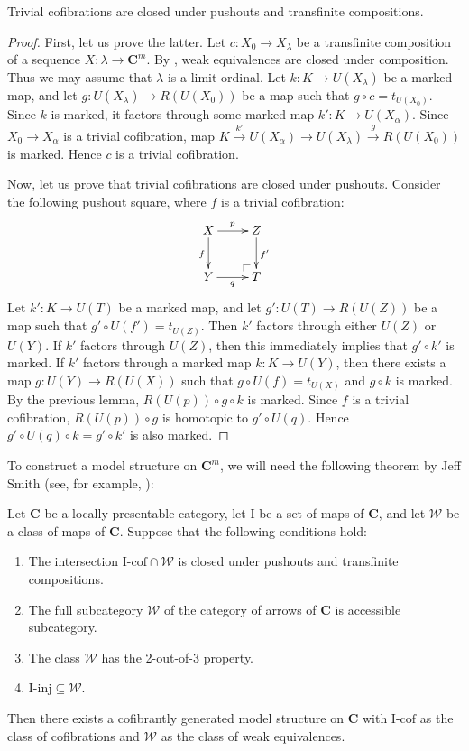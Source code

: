 \documentclass[reqno]{amsart}
\makeatletter
\theoremstyle{definition}
\theoremstyle{remark}
\newcommand{\cat}[1]{\mathbf{#1}}
\newcommand{\C}{\cat{C}}
\newcommand{\we}{\mathcal{W}}
\newcommand{\I}{\mathrm{I}}
\newcommand{\class}[2]{#1\text{-}\mathrm{#2}}
\newcommand{\Icof}[1][\I]{\class{#1}{cof}}
\newcommand{\Iinj}[1][\I]{\class{#1}{inj}}
\numberwithin{figure}{section}
\newcommand{\po}[1][dr]{\save*!/#1+1.2pc/#1:(1,-1)@^{|-}\restore}
\makeatother
\begin{document}
\begin{prop}
Trivial cofibrations are closed under pushouts and transfinite compositions.
\end{prop}
\begin{proof}
First, let us prove the latter.
Let $c : X_0 \to X_\lambda$ be a transfinite composition of a sequence $X : \lambda \to \C^m$.
By , weak equivalences are closed under composition.
Thus we may assume that $\lambda$ is a limit ordinal.
Let $k : K \to U(X_\lambda)$ be a marked map, and let $g : U(X_\lambda) \to R(U(X_0))$ be a map such that $g \circ c = t_{U(X_0)}$.
Since $k$ is marked, it factors through some marked map $k' : K \to U(X_\alpha)$.
Since $X_0 \to X_\alpha$ is a trivial cofibration, map $K \xrightarrow{k'} U(X_\alpha) \to U(X_\lambda) \xrightarrow{g} R(U(X_0))$ is marked.
Hence $c$ is a trivial cofibration.

Now, let us prove that trivial cofibrations are closed under pushouts.
Consider the following pushout square, where $f$ is a trivial cofibration:
\[ \xymatrix{ X \ar[r]^p \ar[d]_f & Z \ar[d]^{f'} \\
              Y \ar[r]_q & \po T
            } \]
Let $k' : K \to U(T)$ be a marked map, and let $g' : U(T) \to R(U(Z))$ be a map such that $g' \circ U(f') = t_{U(Z)}$.
Then $k'$ factors through either $U(Z)$ or $U(Y)$.
If $k'$ factors through $U(Z)$, then this immediately implies that $g' \circ k'$ is marked.
If $k'$ factors through a marked map $k : K \to U(Y)$, then there exists a map $g : U(Y) \to R(U(X))$ such that $g \circ U(f) = t_{U(X)}$ and $g \circ k$ is marked.
By the previous lemma, $R(U(p)) \circ g \circ k$ is marked.
Since $f$ is a trivial cofibration, $R(U(p)) \circ g$ is homotopic to $g' \circ U(q)$.
Hence $g' \circ U(q) \circ k = g' \circ k'$ is also marked.
\end{proof}

To construct a model structure on $\C^m$, we will need the following theorem by Jeff Smith (see, for example, \cite[Proposition~A.2.6.8]{lurie-topos}):
\begin{thm}
Let $\C$ be a locally presentable category, let $\I$ be a set of maps of $\C$, and let $\we$ be a class of maps of $\C$.
Suppose that the following conditions hold:
\begin{enumerate}
\item The intersection $\Icof \cap \we$ is closed under pushouts and transfinite compositions.
\item The full subcategory $\we$ of the category of arrows of $\C$ is accessible subcategory.
\item The class $\we$ has the 2-out-of-3 property.
\item $\Iinj \subseteq \we$.
\end{enumerate}
Then there exists a cofibrantly generated model structure on $\C$ with $\Icof$ as the class of cofibrations and $\we$ as the class of weak equivalences.
\end{thm}
\end{document}
